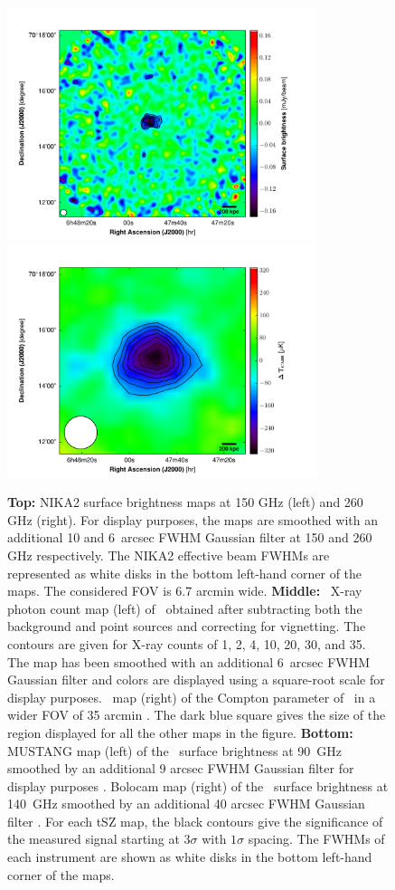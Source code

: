\documentclass[traditabstract]{aa}
\begin{document}
\begin{figure}
\includegraphics[height=6.8cm]{Mustang_PSZ2G144_3mm.pdf}
\includegraphics[height=6.8cm]{Bolocam_PSZ2G144_2mm.pdf}
\caption{{\footnotesize \textbf{Top:} NIKA2 surface brightness maps at 150 GHz (left) and 260 GHz (right). For display purposes, the maps are smoothed with an additional 10 and 6~arcsec FWHM Gaussian filter at 150 and 260 GHz respectively. The NIKA2 effective beam FWHMs are represented as white disks in the bottom left-hand corner of the maps. The considered FOV is 6.7 arcmin wide. \textbf{Middle:} \xmm\ X-ray photon count map (left) of \psz\ obtained after subtracting both the background and point sources and correcting for vignetting. The contours are given for X-ray counts of 1, 2, 4, 10, 20, 30, and 35. The map has been smoothed with an additional 6~arcsec FWHM Gaussian filter and colors are displayed using a square-root scale for display purposes. \planck\ map (right) of the Compton parameter of \psz\ in a wider FOV of 35 arcmin \citep{pla16d}. The dark blue square gives the size of the region displayed for all the other maps in the figure. \textbf{Bottom:} MUSTANG map (left) of the \psz\ surface brightness at 90~GHz smoothed by an additional 9 arcsec FWHM Gaussian filter for display purposes \citep{you15}. Bolocam  map (right) of the \psz\ surface brightness at 140~GHz smoothed by an additional 40 arcsec FWHM Gaussian filter \citep{say13}. For each tSZ map, the black contours give the significance of the measured signal starting at $3\sigma$ with $1\sigma$ spacing. The FWHMs of each instrument are shown as white disks in the bottom left-hand corner of the maps.}}
\label{fig:NIKA2_maps}
\end{figure}
\end{document}
